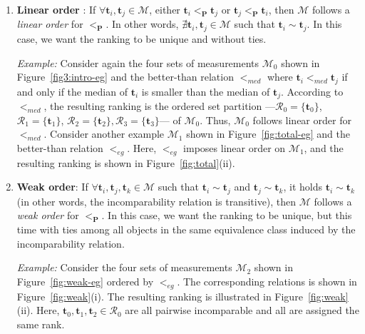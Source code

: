 \documentclass[acmsmall,screen, review]{acmart}
\begin{document}
\begin{enumerate}
	\setlength\itemsep{1em}
	\item \textbf{Linear order}  : If $\forall \mathbf{t}_i, \mathbf{t}_j \in \mathcal{M}$, either $\mathbf{t}_i <_{\mathbf{P}}  \mathbf{t}_j$ or  $\mathbf{t}_j <_{\mathbf{P}}  \mathbf{t}_i$, then $\mathcal{M}$ follows a \textit{linear order} for $<_{\mathbf{P}} $. In other words, $\nexists \mathbf{t}_i, \mathbf{t}_j \in \mathcal{M}$ such that $\mathbf{t}_i \sim \mathbf{t}_j$. In this case, we want the ranking to be unique and without ties.
	
	\textit{Example:} Consider again the four sets of measurements $\mathcal{M}_0$ shown in  Figure~\ref{fig3:intro-eg} and the better-than relation $<_{med}$ where $\mathbf{t}_i <_{med} \mathbf{t}_j$ if and only if the median of $\mathbf{t}_i$ is smaller than the median of $\mathbf{t}_j$. According to $<_{med}$, the resulting ranking is the ordered set partition  ---$\mathcal{R}_0=\{\mathbf{t}_0\}$, $\mathcal{R}_1 = \{\mathbf{t}_1\}$, $\mathcal{R}_2 = \{\mathbf{t}_2\}, \mathcal{R}_3 = \{\mathbf{t}_3\}$--- of $\mathcal{M}_0$.
	  Thus, $\mathcal{M}_0$ follows linear order for $<_{med}$.
	   Consider another example $\mathcal{M}_1$ shown in Figure~\ref{fig:total-eg} and the better-than relation $<_{eg}$. 
	   Here, $<_{eg}$ imposes linear order on $\mathcal{M}_{1}$, and the resulting ranking is shown in Figure~\ref{fig:total}(ii).
	
	
	\item \textbf{Weak order}: If $\forall \mathbf{t}_i, \mathbf{t}_j, \mathbf{t}_k \in \mathcal{M}$ such that $\mathbf{t}_i \sim \mathbf{t}_j$ and $\mathbf{t}_j \sim \mathbf{t}_k$, it holds $\mathbf{t}_i \sim \mathbf{t}_k$ (in  other words, the incomparability relation is transitive),  then $\mathcal{M}$ follows a \textit{weak order} for $<_{\mathbf{P}} $.   In this case,  we want the ranking to be unique, but this time with ties among all objects in the same equivalence class induced by the incomparability relation. 
	
	\textit{Example:} Consider the four sets of measurements $\mathcal{M}_2$ shown in Figure~\ref{fig:weak-eg} ordered by $<_{eg}$. The corresponding relations is shown in Figure~\ref{fig:weak}(i). The resulting ranking is illustrated in Figure~\ref{fig:weak}(ii). Here,  $\mathbf{t}_0, \mathbf{t}_1, \mathbf{t}_2 \in \mathcal{R}_0$ are all pairwise incomparable and all are assigned the same rank.
	

\end{enumerate}
\end{document}
